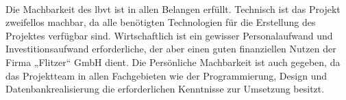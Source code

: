 \vspace{0.2cm} \\
 Die Machbarkeit des \gls{lbvt} ist in allen Belangen erfüllt. Technisch ist das Projekt zweifellos machbar, da alle benötigten Technologien für die Erstellung des Projektes verfügbar sind. Wirtschaftlich ist ein gewisser Personalaufwand und Investitionsaufwand erforderliche, der aber einen guten finanziellen Nutzen der Firma „Flitzer“ GmbH dient. Die Persönliche Machbarkeit ist auch gegeben, da das Projektteam in allen Fachgebieten wie der Programmierung, Design und Datenbankrealisierung die erforderlichen Kenntnisse zur Umsetzung besitzt. 

